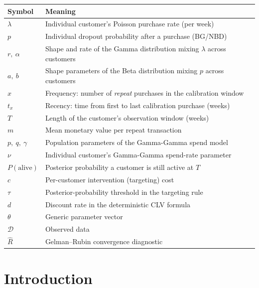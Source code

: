 \documentclass[12pt, a4paper, oneside]{report}
\begin{document}
\begin{longtable}{@{}p{2.6cm}p{\dimexpr\linewidth-3.1cm\relax}@{}}
  \toprule
  \textbf{Symbol} & \textbf{Meaning} \\
  \midrule
  \endhead
  $\lambda$          & Individual customer's Poisson purchase rate (per week) \\
  $p$                & Individual dropout probability after a purchase (BG/NBD) \\
  $r,\ \alpha$       & Shape and rate of the Gamma distribution mixing $\lambda$ across customers \\
  $a,\ b$            & Shape parameters of the Beta distribution mixing $p$ across customers \\
  $x$                & Frequency: number of \emph{repeat} purchases in the calibration window \\
  $t_x$              & Recency: time from first to last calibration purchase (weeks) \\
  $T$                & Length of the customer's observation window (weeks) \\
  $m$                & Mean monetary value per repeat transaction \\
  $p,\ q,\ \gamma$   & Population parameters of the Gamma-Gamma spend model \\
  $\nu$              & Individual customer's Gamma-Gamma spend-rate parameter \\
  $P(\text{alive})$  & Posterior probability a customer is still active at $T$ \\
  $c$                & Per-customer intervention (targeting) cost \\
  $\tau$             & Posterior-probability threshold in the targeting rule \\
  $d$                & Discount rate in the deterministic CLV formula \\
  $\theta$           & Generic parameter vector \\
  $\mathcal{D}$      & Observed data \\
  $\widehat{R}$      & Gelman--Rubin convergence diagnostic \\
  \bottomrule
\end{longtable}

\clearpage
{}

\chapter{Introduction}
\label{ch:introduction}
\end{document}
